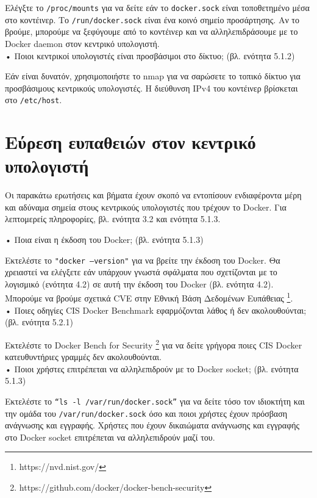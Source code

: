 Ελέγξτε το \texttt{\textlatin{/proc/mounts}} για να δείτε εάν το
\texttt{\textlatin{docker.sock}} είναι τοποθετημένο μέσα στο κοντέινερ.
Το \texttt{\textlatin{/run/docker.sock}} είναι ένα κοινό σημείο προσάρτησης. Αν
το βρούμε, μπορούμε να ξεφύγουμε από το κοντέινερ και να αλληλεπιδράσουμε με το
\textlatin{Docker daemon} στον κεντρικό υπολογιστή. \\


• Ποιοι κεντρικοί υπολογιστές είναι προσβάσιμοι στο δίκτυο; (βλ. ενότητα 5.1.2)

Εάν είναι δυνατόν, χρησιμοποιήστε το \textlatin{nmap} για να σαρώσετε το τοπικό
δίκτυο για προσβάσιμους κεντρικούς υπολογιστές. Η διεύθυνση \textlatin{IPv4} του
κοντέινερ βρίσκεται στο \texttt{\textlatin{/etc/host}}. \\


\section{Εύρεση ευπαθειών στον κεντρικό υπολογιστή}

Οι παρακάτω ερωτήσεις και βήματα έχουν σκοπό να εντοπίσουν ενδιαφέροντα μέρη
και αδύναμα σημεία στους κεντρικούς υπολογιστές που τρέχουν το
\textlatin{Docker}. Για λεπτομερείς πληροφορίες, βλ. ενότητα 3.2 και ενότητα
5.1.3.


• Ποια είναι η έκδοση του \textlatin{Docker}; (βλ. ενότητα 5.1.3)

Εκτελέστε το \texttt{\textlatin{"docker --version"}} για να βρείτε την έκδοση
του \textlatin{Docker}. Θα χρειαστεί να ελέγξετε εάν υπάρχουν γνωστά σφάλματα
που σχετίζονται με το λογισμικό (ενότητα 4.2) σε αυτή την έκδοση του
\textlatin{Docker} (βλ. ενότητα 4.2). Μπορούμε να βρούμε σχετικά \textlatin{CVE}
στην Εθνική Βάση Δεδομένων Ευπάθειας
\footnote{\textlatin{https://nvd.nist.gov/}}. \\

• Ποιες οδηγίες \textlatin{CIS Docker Benchmark} εφαρμόζονται λάθος ή δεν
ακολουθούνται; (βλ. ενότητα 5.2.1)

Εκτελέστε το \textlatin{Docker Bench for Security}
\footnote{\textlatin{https://github.com/docker/docker-bench-security}}
για να δείτε γρήγορα ποιες \textlatin{CIS Docker} κατευθυντήριες γραμμές
δεν ακολουθούνται. \\


• Ποιοι χρήστες επιτρέπεται να αλληλεπιδρούν με το \textlatin{Docker socket};
(βλ. ενότητα 5.1.3)

Εκτελέστε το \texttt{\textlatin{“ls -l /var/run/docker.sock”}} για να δείτε τόσο
τον ιδιοκτήτη και την ομάδα του \texttt{\textlatin{/var/run/docker.sock}} όσο
και ποιοι χρήστες έχουν πρόσβαση ανάγνωσης και εγγραφής. Χρήστες που έχουν
δικαιώματα ανάγνωσης και εγγραφής στο \textlatin{Docker socket} επιτρέπεται να
αλληλεπιδρούν μαζί του. \\

